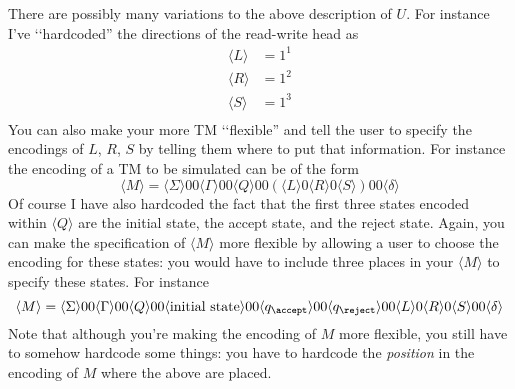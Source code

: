   There are possibly many variations to the above description of $U$.
  For instance I've \lq\lq hardcoded'' the directions of the read-write head
  as
  \begin{align*}
    \langle L \rangle &= 1^1 \\
    \langle R \rangle &= 1^2 \\
    \langle S \rangle &= 1^3 \\
  \end{align*}
  You can also make your more TM \lq\lq flexible'' and tell the
  user to specify the encodings of $L$, $R$, $S$ by telling them where to
  put that information.
  For instance the encoding of a TM to be simulated can be of the form
  \[
  \langle M \rangle
  =
  \langle \Sigma \rangle 00
  \langle \Gamma \rangle 00
  \langle Q \rangle 00
  (\langle L \rangle 0
  \langle R \rangle 0
  \langle S \rangle) 00
  \langle \delta \rangle  
  \]
  Of course I have also hardcoded the fact that
  the first three states encoded within $\langle Q \rangle$
  are the initial state, the accept state, and the reject state.
  Again, you can make the specification of $\langle M \rangle$
  more flexible by allowing a user to choose the encoding for
  these states: you would have to include three places in your
  $\langle M \rangle$ to specify these states. For instance
  \[
  \langle M \rangle
  =
  \langle \Sigma \rangle 00
  \langle \Gamma \rangle 00
  \langle Q \rangle 00
  \langle \text{initial state} \rangle 00
  \langle q_\accept \rangle 00
  \langle q_\reject \rangle 00  
  \langle L \rangle 0
  \langle R \rangle 0
  \langle S \rangle 00
  \langle \delta \rangle  
  \]
  Note that although you're making the encoding of $M$ more flexible,
  you still have to somehow hardcode some things: you have to
  hardcode the \textit{position} in the encoding of $M$ where
  the above are placed.

